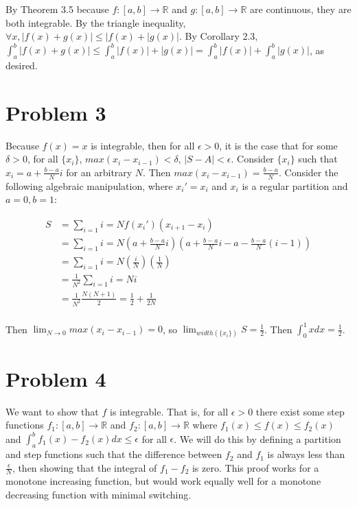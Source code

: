 \documentclass[10pt]{article} %
\begin{document}
By Theorem 3.5 because $f:[a,b]\rightarrow\mathbb{R}$ and $g:[a,b]\rightarrow\mathbb{R}$ are continuous, they are both integrable. By the triangle inequality, $\forall x, |f(x) + g(x)| \leq |f(x) + |g(x)|$. By Corollary 2.3, $\int_a^b |f(x)+g(x)| \leq \int_a^b |f(x)|+|g(x)| = \int_a^b |f(x)| + \int_a^b |g(x)|$, as desired.\\

\section{Problem 3}
Because $f(x) = x$ is integrable, then for all $\epsilon > 0$, it is the case that for some $\delta > 0$, for all $\{x_i\}$, $max(x_i-x_{i-1})<\delta$, $|S - A| < \epsilon$. Consider $\{x_i\}$ such that $x_i = a + \frac{b-a}{N}i$ for an arbitrary $N$. Then $max(x_i-x_{i-1}) = \frac{b-a}{N}$. Consider the following algebraic manipulation, where $x_i' = x_i$ and $x_i$ is a regular partition and $a=0, b=1$:

\begin{align*}
  S &= \sum_{i=1}{i=N}f(x_i')(x_{i+1}-x_i)\\
  &= \sum_{i=1}{i=N}\left(a+\frac{b-a}{N}i\right)\left(a+\frac{b-a}{N}i - a -\frac{b-a}{N}(i-1)\right)\\
  &= \sum_{i=1}{i=N}\left(\frac{i}{N}\right)\left(\frac{1}{N}\right)\\
  &= \frac{1}{N^2}\sum_{i=1}{i=N}i\\
  &= \frac{1}{N^2}\frac{N(N+1)}{2} = \frac{1}{2} + \frac{1}{2N}\\
\end{align*}

Then $\lim_{N\rightarrow0} max(x_i-x_{i-1}) = 0$, so $\lim_{width(\{x_i\})} S = \frac{1}{2}$. Then $\int_0^1xdx = \frac{1}{2}$.\\


\section{Problem 4}
We want to show that $f$ is integrable. That is, for all $\epsilon>0$ there exist some step functions $f_1:[a,b]\rightarrow\mathbb{R}$ and $f_2:[a,b]\rightarrow\mathbb{R}$ where $f_1(x) \leq f(x) \leq f_2(x)$ and $\int_a^b f_1(x) - f_2(x)dx \leq \epsilon$ for all $\epsilon$. We will do this by defining a partition and step functions such that the difference between $f_2$ and $f_1$ is always less than $\frac{\epsilon}{N}$, then showing that the integral of $f_1-f_2$ is zero. This proof works for a monotone increasing function, but would work equally well for a monotone decreasing function with minimal switching.\\
\end{document}
